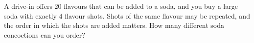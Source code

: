 A drive-in offers $20$ flavours that can be added to a soda, and you buy a large soda with exactly $4$ flavour shots. Shots of the same flavour may be repeated, and the order in which the shots are added matters. How many different soda concoctions can you order?
